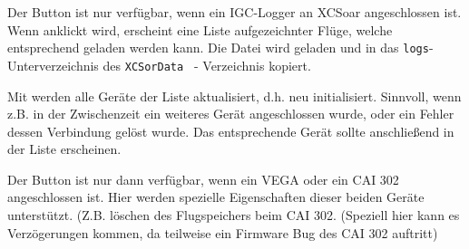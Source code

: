 Der Button  ist nur verfügbar, wenn ein IGC-Logger an \textsf{XCSoar} angeschlossen ist.  \label{sec:supported-varios}
Wenn anklickt wird, erscheint eine Liste aufgezeichnter Flüge, welche entsprechend geladen werden kann.  Die Datei  wird geladen und in das \texttt{logs}-Unterverzeichnis des  \texttt{XCSorData } - Verzeichnis kopiert.

Mit  werden alle Geräte der Liste aktualisiert, d.h. neu initialisiert. Sinnvoll, wenn z.B. in der Zwischenzeit ein weiteres Gerät angeschlossen wurde, oder ein Fehler dessen Verbindung gelöst wurde. Das entsprechende Gerät sollte anschließend in der Liste erscheinen.


Der Button  ist nur dann verfügbar, wenn ein VEGA oder ein CAI 302 angeschlossen ist. Hier werden spezielle Eigenschaften dieser beiden Geräte unterstützt. (Z.B. löschen des Flugspeichers beim CAI 302. (Speziell hier kann es Verzögerungen kommen, da teilweise ein Firmware Bug des CAI 302 auftritt)
